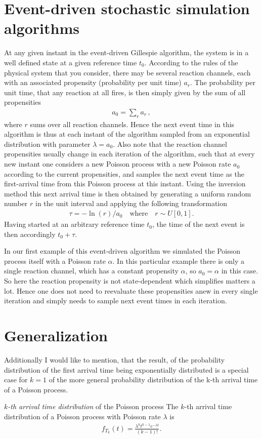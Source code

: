 \documentclass[11pt,DINA4, fleqn]{amsart}
\begin{document}
\section{Event-driven stochastic simulation algorithms}
At any given instant in the event-driven Gillespie algorithm, the system is in a well defined state at a given reference time $t_0$. According to the rules of the physical system that you consider, there may be several reaction channels, each with an associated propensity (probability per unit time) $a_r$. The probability per unit time, that any reaction at all fires, is then simply given by the sum of all propensities
\begin{align}
a_0 = \sum_r a_r\, ,
\end{align} 
where $r$ sums over all reaction channels.
Hence the next event time in this algorithm is thus at each instant of the algorithm sampled from an exponential distribution with parameter $\lambda = a_0$. Also note that the reaction channel propensities usually change in each iteration of the algorithm, such that at every new instant one considers a new Poisson process with a new Poisson rate $a_0$ according to the current propensities, and samples the next event time as the first-arrival time from this Poisson process at this instant. Using the inversion method this next arrival time is then obtained by generating a uniform random number $r$ in the unit interval and applying the following transformation
\begin{align}
\tau = -\ln(r) / a_0 \quad \text{where} \quad r \sim U[0,1].
\end{align}
Having started at an arbitrary reference time $t_0$, the time of the next event is then accordingly $t_0+\tau$.

In our first example of this event-driven algorithm we simulated the Poisson process itself with a Poisson rate $\alpha$. In this particular example there is only a single reaction channel, which has a constant propensity $\alpha$, so $a_0 = \alpha$ in this case. So here the reaction propensity is not state-dependent which simplifies matters a lot. Hence one does not need to reevaluate these propensities anew in every single iteration and simply needs to sample next event times in each iteration.

\section{Generalization}

Additionally I would like to mention, that the result, of the probability distribution of the first arrival time being exponentially distributed is a special case for $k=1$ of the more general probability distribution of the k-th arrival time of a Poisson process.
\begin{mybox_tc3}{\emph{$k$-th arrival time distribution} of the Poisson process}
	The $k$-th arrival time distribution of a Poisson process with Poisson rate $\lambda$ is
	\begin{align}
f_{T_k}(t) = \frac{\lambda^k t^{k-1}e^{-\lambda t}}{(k-1)!}.
	\end{align}
\end{mybox_tc3}
\end{document}
